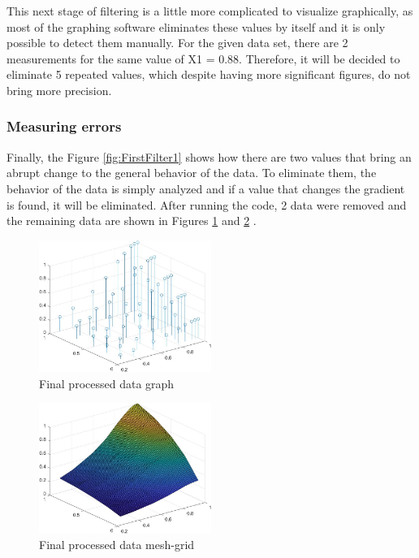 \documentclass{article}
\begin{document}
\begin{doublespacing}
\noindent This next stage of filtering is a little more complicated to visualize graphically, as most of the graphing software eliminates these values by itself and it is only possible to detect them manually. For the given data set, there are 2 measurements for the same value of X1 = 0.88. Therefore, it will be decided to eliminate 5 repeated values, which despite having more significant figures, do not bring more precision.

\subsubsection{Measuring errors}

\par Finally, the Figure \ref{fig:FirstFilter1} shows how there are two values that bring an abrupt change to the general behavior of the data. To eliminate them, the behavior of the data is simply analyzed and if a value that changes the gradient is found, it will be eliminated. After running the code, 2 data were removed and the remaining data are shown in Figures \ref{fig:Processed2} and \ref{fig:Processed1} .

\begin{figure}[H] 
    \centering
    \includegraphics[width=0.5\textwidth]{Images/ProcessedData2.JPG} 
    \caption{Final processed data graph} 
    \label{fig:Processed2} 
\end{figure}

\begin{figure}[H] 
    \centering
    \includegraphics[width=0.5\textwidth]{Images/ProcessedData1.JPG} 
    \caption{Final processed data mesh-grid} 
    \label{fig:Processed1} 
\end{figure}






\end{doublespacing}
\end{document}
